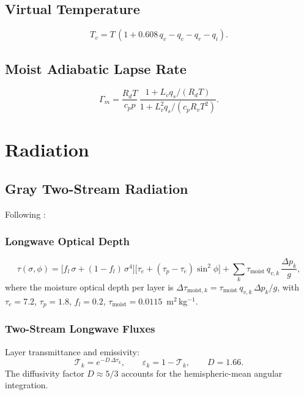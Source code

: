 \documentclass[11pt,twoside]{report}
\newcommand{\Rd}{R_d}
\newcommand{\cpd}{c_p}
\newcommand{\Lv}{L_v}
\newcommand{\Rv}{R_v}
\begin{document}
\subsection{Virtual Temperature}
\begin{equation}
  T_v = T\,(1 + 0.608\,q_v - q_c - q_r - q_i).
\end{equation}

\subsection{Moist Adiabatic Lapse Rate}
\begin{equation}
  \Gamma_m = \frac{\Rd T}{\cpd p}\,
  \frac{1+\Lv q_s/(\Rd T)}{1+\Lv^2 q_s/(\cpd\Rv T^2)}.
\end{equation}


\section{Radiation}
\label{sec:radiation}

\subsection{Gray Two-Stream Radiation}
\label{sec:gray-rad}

Following \citet{Frierson2006}:

\subsubsection{Longwave Optical Depth}
\begin{equation}
  \tau(\sigma,\phi) = \bigl[f_l\,\sigma+(1-f_l)\,\sigma^4\bigr]
  \bigl[\tau_e+(\tau_p-\tau_e)\sin^2\!\phi\bigr]
  + \sum_k \tau_{\mathrm{moist}}\,q_{v,k}\,\frac{\Delta p_k}{g},
\end{equation}
where the moisture optical depth per layer is
$\Delta\tau_{\mathrm{moist},k}=\tau_{\mathrm{moist}}\,q_{v,k}\,\Delta p_k/g$,
with $\tau_e=7.2$, $\tau_p=1.8$, $f_l=0.2$,
$\tau_{\mathrm{moist}}=0.0115$~m$^2$\,kg$^{-1}$.

\subsubsection{Two-Stream Longwave Fluxes}

Layer transmittance and emissivity:
\begin{equation}
  \mathcal{T}_k = e^{-D\,\Delta\tau_k},
  \qquad \varepsilon_k = 1-\mathcal{T}_k,
  \qquad D=1.66.
\end{equation}
The diffusivity factor $D\approx 5/3$ accounts for the hemispheric-mean
angular integration.
\end{document}
